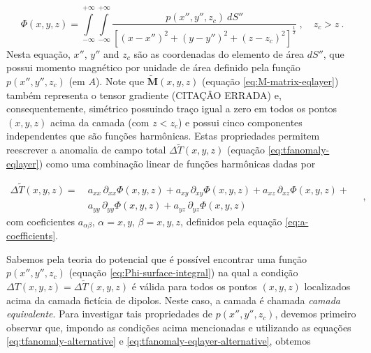 \begin{equation}
	\Phi(x, y, z) = \int\limits_{-\infty}^{+\infty}\int\limits_{-\infty}^{+\infty}
	\frac{p(x'', y'', z_{c}) \: dS''}
	{\left[ (x-x'')^2 + (y-y'')^2 + (z-z_{c})^2 \right]^{\frac{1}{2}}} \: ,
	\quad z_{c} > z \: .
	\label{eq:Phi-surface-integral}
\end{equation}
Nesta equação, $x''$, $y''$ and $z_{c}$ são as coordenadas do elemento de área $dS''$, que possui momento magnético por unidade de área definido pela função $p(x'', y'', z_{c})$ (em $A$). Note que $\tilde{\mathbf{M}}(x, y, z)$ (equação \ref{eq:M-matrix-eqlayer}) também representa o tensor gradiente \citep{pedersen1991} (CITAÇÂO ERRADA) e, consequentemente, simétrico possuindo traço igual a zero em todos os pontos $(x,y,z)$ acima da camada (com $z < z_{c}$) e possui cinco componentes independentes que são funções harmônicas. Estas propriedades permitem reescrever a anomalia de campo total  $\Delta \tilde{T}(x, y, z)$ (equação \ref{eq:tfanomaly-eqlayer}) como uma combinação linear de funções harmônicas dadas por

\begin{equation}
       \begin{split}
		\Delta \tilde{T}(x, y, z) = \:
		& a_{xx} \, \partial_{xx} \Phi(x, y, z) + 
		a_{xy} \, \partial_{xy} \Phi(x, y, z) + 
		a_{xz} \, \partial_{xz} \Phi(x, y, z) + \\
		& a_{yy} \, \partial_{yy} \Phi(x, y, z) + 
		a_{yz} \, \partial_{yz} \Phi(x, y, z)
		\end{split} \quad ,
	\label{eq:tfanomaly-eqlayer-alternative}
\end{equation}
com coeficientes $a_{\alpha\beta}$, $\alpha = x, y$, $\beta = x, y, z$, definidos pela equação \ref{eq:a-coefficients}.

Sabemos pela teoria do potencial que é possível encontrar uma função $p(x'', y'', z_{c})$ (equação \ref{eq:Phi-surface-integral}) na qual a condição $\Delta T(x, y, z) = \Delta \tilde{T}(x, y, z)$ é válida para todos os pontos $(x,y,z)$ localizados acima da camada fictícia de dipolos. Neste caso, a camada é chamada \textit{camada equivalente}. Para investigar tais propriedades de $p(x'', y'', z_{c})$, devemos primeiro observar que, impondo as condições acima mencionadas e utilizando as equações \ref{eq:tfanomaly-alternative} e \ref{eq:tfanomaly-eqlayer-alternative}, obtemos 

